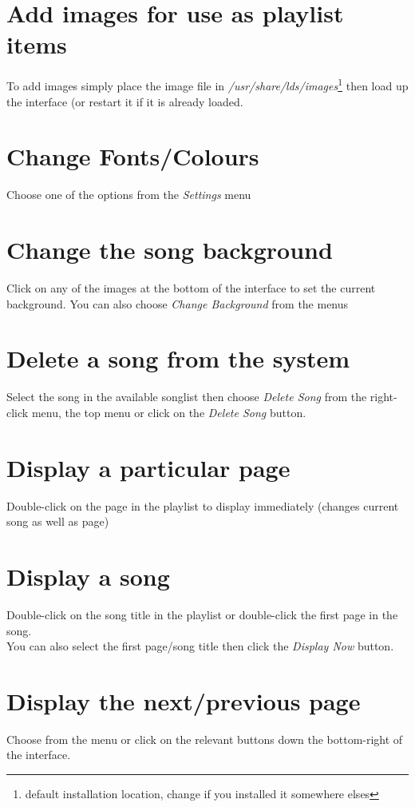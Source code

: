 \documentclass[11pt,twoside]{book}
\begin{document}
\section{Add images for use as playlist items}
To add images simply place the image file in \emph{/usr/share/lds/images}\footnote{default installation location, change if you installed it somewhere elses} then load up the interface (or restart it if it is already loaded.

\section{Change Fonts/Colours}
Choose one of the options from the \emph{Settings} menu

\section{Change the song background}
Click on any of the images at the bottom of the interface to set the current background.  You can also choose \emph{Change Background} from the menus

\section{Delete a song from the system}
Select the song in the available songlist then choose \emph{Delete Song} from the right-click menu, the top menu or click on the \emph{Delete Song} button.

\section{Display a particular page}
Double-click on the page in the playlist to display immediately (changes current song as well as page)

\section{Display a song}
Double-click on the song title in the playlist or double-click the first page in the song.\\
You can also select the first page/song title then click the \emph{Display Now} button.

\section{Display the next/previous page}
Choose from the menu or click on the relevant buttons down the bottom-right of the interface.
\end{document}
